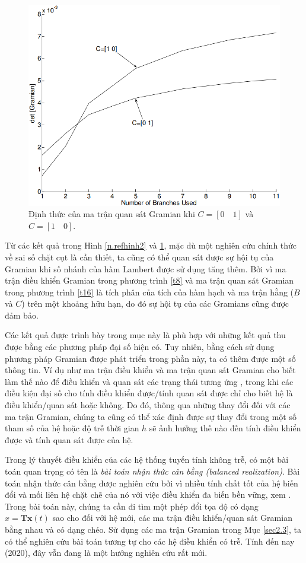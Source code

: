 \begin{vd}
\begin{figure}[t]
	\centering
	\includegraphics[width=0.6\linewidth]{hinh/hinh3n}
	\caption{Định thức của ma trận quan sát Gramian khi $C=[0\quad 1]$ và $C=[1\quad 0]$.}
	\label{n.refhinh3}
\end{figure}        
%  

Từ các kết quả trong Hình \ref{n.refhinh2} và \ref{n.refhinh3}, mặc dù một nghiên cứu chính thức về sai số chặt cụt là cần thiết, ta cũng có thể quan sát được sự hội tụ của Gramian khi số nhánh của hàm Lambert được sử dụng tăng thêm. Bởi vì ma trận điều khiển Gramian trong phương trình \eqref{t8} và ma trận quan sát Gramian trong phương trình \eqref{t16} là tích phân của tích của hàm hạch và ma trận hằng ($B$ và $C$) trên một khoảng hữu hạn, do đó sự hội tụ của các Gramians cũng được đảm bảo.
\end{vd}

Các kết quả được trình bày trong mục này là phù hợp với những kết quả thu được bằng các phương pháp đại số hiện có. Tuy nhiên, bằng cách sử dụng phương pháp Gramian được phát triển trong phần này, ta có thêm được một số thông tin. Ví dụ như ma trận điều khiển và ma trận quan sát Gramian cho biết làm thế nào để điều khiển và quan sát các trạng thái tương ứng \cite{Hol96}, trong khi các điều kiện đại số cho tính điều khiển được/tính quan sát được chỉ cho biết hệ là điều khiển/quan sát hoặc không. 
%
Do đó, thông qua những thay đổi đối với các ma trận Gramian, chúng ta cũng có thể xác định được sự thay đổi trong một số tham số của hệ hoặc độ trễ thời gian $h$ sẽ ảnh hưởng thế nào đến tính điều khiển được và tính quan sát được của hệ.

Trong lý thuyết điều khiển của các hệ thống tuyến tính không trễ, có một bài toán quan trọng có tên là \emph{bài toán nhận thức cân bằng (balanced realization)}. 
Bài toán nhận thức cân bằng được nghiên cứu bởi vì nhiều tính chất tốt của hệ biến đổi và mối liên hệ chặt chẽ của nó với việc điều khiển đa biến bền vững, xem \cite{Ver83}. Trong bài toán này, chúng ta cần đi tìm một phép đổi tọa độ có dạng $\hat{x}=\mathbf{Tx}(t)$ sao cho đối với hệ mới, các ma trận điều khiển/quan sát  Gramian bằng nhau và có dạng chéo. Sử dụng các ma trận Gramian trong Mục \ref{sec2.3}, ta có thể nghiên cứu bài toán tương tự cho các hệ điều khiển có trễ. Tính đến nay (2020), đây vẫn đang là một hướng nghiên cứu rất mới.

